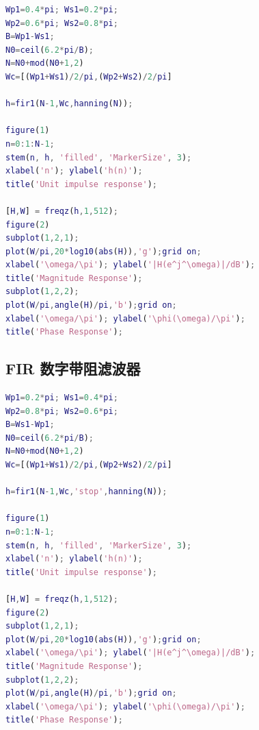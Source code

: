 \documentclass[12pt,AutoFakeBold]{article}
\begin{document}
\begin{appendices}
\begin{lstlisting}[language=Matlab]
% Band-pass filter
Wp1=0.4*pi; Ws1=0.2*pi;
Wp2=0.6*pi; Ws2=0.8*pi;
B=Wp1-Ws1;
N0=ceil(6.2*pi/B);
N=N0+mod(N0+1,2)
Wc=[(Wp1+Ws1)/2/pi,(Wp2+Ws2)/2/pi]

h=fir1(N-1,Wc,hanning(N));

figure(1)
n=0:1:N-1;
stem(n, h, 'filled', 'MarkerSize', 3);
xlabel('n'); ylabel('h(n)');
title('Unit impulse response');

[H,W] = freqz(h,1,512);
figure(2)
subplot(1,2,1);
plot(W/pi,20*log10(abs(H)),'g');grid on;
xlabel('\omega/\pi'); ylabel('|H(e^j^\omega)|/dB');
title('Magnitude Response');
subplot(1,2,2);
plot(W/pi,angle(H)/pi,'b');grid on;
xlabel('\omega/\pi'); ylabel('\phi(\omega)/\pi');
title('Phase Response');
\end{lstlisting}

\subsection{FIR 数字带阻滤波器}

\begin{lstlisting}[language=Matlab]
% Band-stop filter
Wp1=0.2*pi; Ws1=0.4*pi;
Wp2=0.8*pi; Ws2=0.6*pi;
B=Ws1-Wp1;
N0=ceil(6.2*pi/B);
N=N0+mod(N0+1,2)
Wc=[(Wp1+Ws1)/2/pi,(Wp2+Ws2)/2/pi]

h=fir1(N-1,Wc,'stop',hanning(N));

figure(1)
n=0:1:N-1;
stem(n, h, 'filled', 'MarkerSize', 3);
xlabel('n'); ylabel('h(n)');
title('Unit impulse response');

[H,W] = freqz(h,1,512);
figure(2)
subplot(1,2,1);
plot(W/pi,20*log10(abs(H)),'g');grid on;
xlabel('\omega/\pi'); ylabel('|H(e^j^\omega)|/dB');
title('Magnitude Response');
subplot(1,2,2);
plot(W/pi,angle(H)/pi,'b');grid on;
xlabel('\omega/\pi'); ylabel('\phi(\omega)/\pi');
title('Phase Response');
\end{lstlisting}

\end{appendices}
\end{document}
